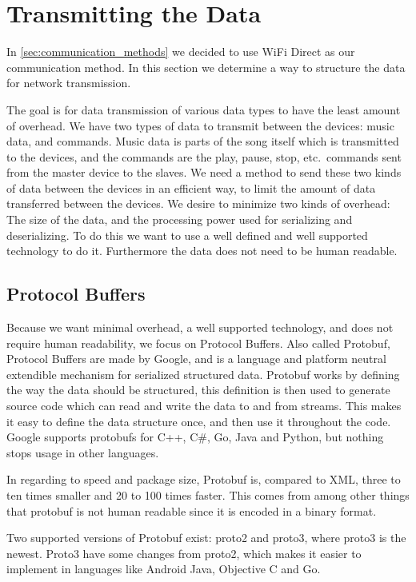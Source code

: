 \section{Transmitting the Data}\label{sec:transmit}
In \cref{sec:communication_methods} we decided to use WiFi Direct as our communication method.
In this section we determine a way to structure the data for network transmission.

\bigskip
The goal is for data transmission of various data types to have the least amount of overhead.
We have two types of data to transmit between the devices: music data, and commands.
Music data is parts of the song itself which is transmitted to the devices,
and the commands are the play, pause, stop, etc.\ commands sent from the master device to the slaves.
We need a method to send these two kinds of data between the devices in an efficient way,
to limit the amount of data transferred between the devices.
We desire to minimize two kinds of overhead: The size of the data, and the processing power used for serializing and deserializing.
To do this we want to use a well defined and well supported technology to do it.
Furthermore the data does not need to be human readable.

\subsection{Protocol Buffers}
Because we want minimal overhead, a well supported technology, and does not require human readability, we focus on Protocol Buffers.
Also called Protobuf, Protocol Buffers are made by Google, and is a language and platform neutral extendible mechanism for serialized structured data.
Protobuf works by defining the way the data should be structured, this definition is then used to generate source code which can read and write the data to and from streams.\cite{protobuf}
This makes it easy to define the data structure once, and then use it throughout the code.
Google supports protobufs for C++, C\#, Go, Java and Python, but nothing stops usage in other languages\cite{protobuf}.

In regarding to speed and package size, Protobuf is, compared to XML, three to ten times smaller and 20 to 100 times faster.
This comes from among other things that protobuf is not human readable since it is encoded in a binary format.\cite{protobuf}

Two supported versions of Protobuf exist: proto2 and proto3, where proto3 is the newest.
Proto3 have some changes from proto2, which makes it easier to implement in languages like Android Java, Objective C and Go.\cite{proto3}

